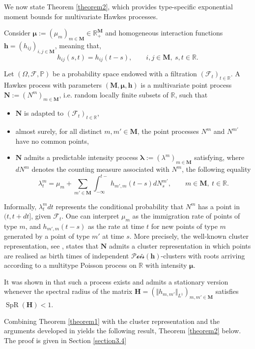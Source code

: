 \documentclass[reqno,final,11pt]{amsart}
\renewcommand{\cite}{\citet}
\theoremstyle{plain}
\theoremstyle{definition}
\theoremstyle{remark}
\newcommand{\R}{\mathds{R}}
\newcommand{\itg}{\displaystyle\int}
\newcommand{\M}{\bm{M}}
\newcommand{\F}{\mathcal{F}}
\newcommand{\h}{\bm{h}}
\newcommand{\Vone}[1]{\Vert #1 \Vert_{L^1}}
\newcommand{\Pois}{\mathscr{P}\!\mathscr{o}\!\mathscr{i}\!\mathscr{s}}
\DeclareMathOperator{\spr}{SpR}
\begin{document}
We now state Theorem \ref{theorem2}, which provides type-specific exponential moment bounds for multivariate Hawkes processes.

Consider $\bm{\mu}:=(\mu_m)_{m\in\M} \in \R_+^{\M}$ and homogeneous interaction functions $\h = (h_{ij})_{i,j\in\M}$, meaning that,
\[
h_{ij}(s,t)=h_{ij}(t-s), \qquad i,j\in\M, \ s,t\in\R.
\]

Let $(\Omega,\F,\mathds{P})$ be a probability space endowed with a filtration $(\F_t)_{t\in\R}$. A Hawkes process with parameters $(\M,\bm{\mu},\bm{h})$ is a multivariate point process $\bm{N}:=(N^m)_{m\in\M}$, i.e. random locally finite subsets of $\R$, such that
\begin{itemize}
    \item $\bm{N}$ is adapted to $(\F_t)_{t\in\R}$,
    \item almost surely, for all distinct $m,m'\in\M$, the point processes $N^m$ and $N^{m'}$ have no common points,
    \item $\bm{N}$ admits a predictable intensity process $\bm{\lambda}:=(\lambda^m)_{m\in\M}$ satisfying, where $dN^m$ denotes the counting measure associated with $N^m$, the following equality
    \begin{equation}\label{eq hawkes}
        \lambda_t^m = \mu_m + \sum_{m'\in\M} \itg_{-\infty}^{t-} h_{m',m}(t-s) dN_s^{m'}, \qquad m\in\M,\ t\in\R.
    \end{equation}
\end{itemize}

Informally, $\lambda_t^m dt$ represents the conditional probability that $N^m$ has a point in $(t,t+dt]$, given $\F_t$. One can interpret $\mu_m$ as the immigration rate of points of type $m$, and $h_{m',m}(t-s)$ as the rate at time $t$ for new points of type $m$ generated by a point of type $m'$ at time $s$. More precisely, the well-known cluster representation, see \cite{hawkes_cluster_1974}, states that $\bm{N}$ admits a cluster representation in which points are realised as birth times of independent $\Pois(\h)$-clusters with roots arriving according to a multitype Poisson process on $\R$ with intensity $\bm{\mu}$.

It was shown in \cite{bremaud_stability_1996} that such a process exists and admits a stationary version whenever the spectral radius of the matrix $\bm{H}=(\Vone{ h_{m,m'}} )_{m,m'\in\M}$ satisfies $\spr(\bm{H})<1$. 

Combining Theorem \ref{theorem1} with the cluster representation and the arguments developed in \cite{leblanc_exponential_2024} yields the following result, Theorem \ref{theorem2} below. The proof is given in Section \ref{section3.4}
\end{document}
